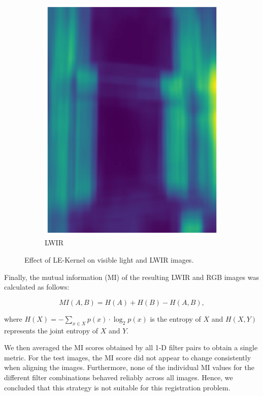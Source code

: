\documentclass{l4proj}
\begin{document}
\begin{figure}[ht]
\begin{subfigure}[h!]{0.25\textwidth}
    \includegraphics[width=\textwidth]{images/registration/filtered_le_lwir.png}
    \caption{LWIR}
  \end{subfigure}
  \caption{Effect of LE-Kernel \citep{laws_rapid_1980} on visible light and LWIR images.}
  \label{fig:le_filter}
\end{figure}

Finally, the mutual information (MI) of the resulting LWIR and RGB images was calculated as follows:

\begin{equation}
  MI(A,B) = H(A) + H(B) - H(A,B),
\end{equation}

where $H(X) = - \sum_{x \in X} p(x) \cdot \log_2 p(x)$ is the entropy of $X$ and $H(X,Y)$ represents the joint entropy of $X$ and $Y$.

We then averaged the MI scores obtained by all 1-D filter pairs to obtain a single metric. For the test images, the MI score did not appear to change consistently when aligning the images. Furthermore, none of the individual MI values for the different filter combinations behaved reliably across all images. Hence, we concluded that this strategy is not suitable for this registration problem.
\end{document}
